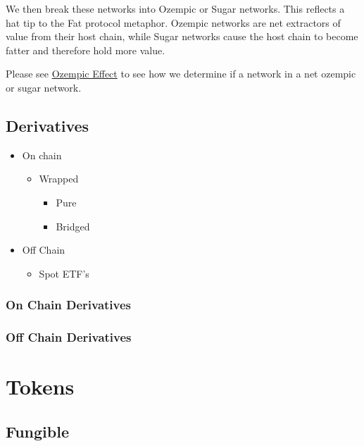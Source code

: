 \documentclass[
  letterpaper,
  DIV=11,
  numbers=noendperiod]{scrreprt}
\providecommand{\tightlist}{%
  \setlength{\itemsep}{0pt}\setlength{\parskip}{0pt}}\usepackage{longtable,booktabs,array}
\begin{document}
We then break these networks into Ozempic or Sugar networks. This
reflects a hat tip to the Fat protocol metaphor. Ozempic networks are
net extractors of value from their host chain, while Sugar networks
cause the host chain to become fatter and therefore hold more value.

Please see \hyperref[ozempic-effect]{Ozempic Effect} to see how we
determine if a network in a net ozempic or sugar network.

\subsection{Derivatives}\label{derivatives}

\begin{itemize}
\tightlist
\item
  On chain

  \begin{itemize}
  \tightlist
  \item
    Wrapped

    \begin{itemize}
    \tightlist
    \item
      Pure
    \item
      Bridged
    \end{itemize}
  \end{itemize}
\item
  Off Chain

  \begin{itemize}
  \tightlist
  \item
    Spot ETF's
  \end{itemize}
\end{itemize}

\subsubsection{On Chain Derivatives}\label{on-chain-derivatives}

\subsubsection{Off Chain Derivatives}\label{off-chain-derivatives}

\section{Tokens}\label{tokens}

\subsection{Fungible}\label{fungible}
\end{document}
